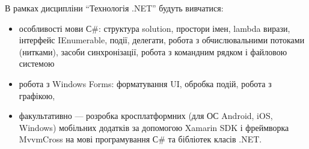 В рамках дисципліни ``Технологія .NET'' будуть вивчатися:
\begin{itemize}
\item особливості мови С\#: структура solution, простори імен, lambda вирази, інтерфейс IEnumerable, події, делегати, робота з обчислювальними потоками (нитками), засоби синхронізації, робота з командним рядком і файловою системою
\item робота з Windows Forms: форматування UI, обробка подій, робота з графікою,
\item факультативно --- розробка кросплатформних (для ОС Android, iOS, Windows) мобільних додатків за допомогою Xamarin SDK і фреймворка MvvmCross на мові програмування С\# та бібліотек класів .NET.
\end{itemize}
